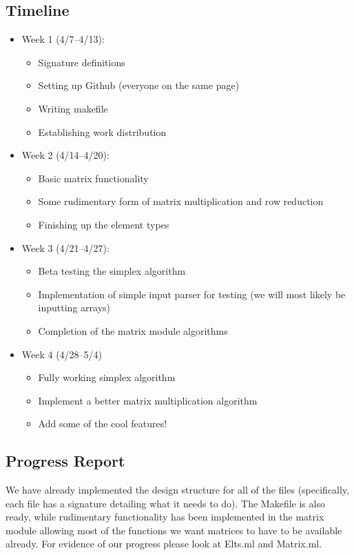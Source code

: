 \documentclass[letterpaper,11pt]{article}
\begin{document}
\subsection{Timeline}
\begin{itemize}
\item Week 1 (4/7--4/13):
  \begin{itemize}
    \item Signature definitions 
    \item Setting up Github (everyone on the same page)
    \item Writing makefile
    \item Establishing work distribution
  \end{itemize}

\item Week 2 (4/14--4/20):
  \begin{itemize}
    \item Basic matrix functionality
    \item Some rudimentary form of matrix multiplication and row reduction
    \item Finishing up the element types
  \end{itemize}

\item Week 3 (4/21--4/27):
  \begin{itemize}
    \item Beta testing the simplex algorithm
    \item Implementation of simple input parser for testing (we will most likely
be inputting arrays)
    \item Completion of the matrix module algorithms
  \end{itemize}

\item Week 4 (4/28--5/4)
  \begin{itemize}
    \item Fully working simplex algorithm
    \item Implement a better matrix multiplication algorithm
    \item Add some of the cool features!
  \end{itemize}
\end{itemize}

\subsection{Progress Report}
We have already implemented the design structure for all of the files
(specifically, each file has a signature detailing what it needs to do). The
Makefile is also ready, while rudimentary functionality has been implemented in
the matrix module allowing most of the functions we want matrices to have to be
available already. For evidence of our progress please look at Elts.ml and
Matrix.ml.
\end{document}

